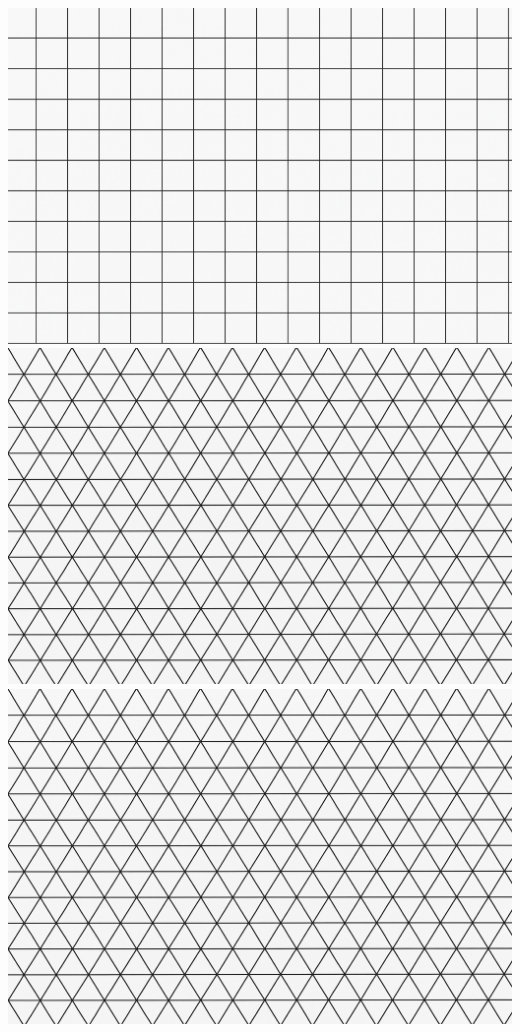 \documentclass[12pt, a4paper, notitlepage]{extreport}
\begin{document}
\begin{center}
    \includegraphics[scale=0.5]{../png/rectangular_grid.png}
    \includegraphics[scale=0.5]{../png/triangular_grid.png}
    \includegraphics[scale=0.5]{../png/triangular_grid.png}

\end{center}
\end{document}
